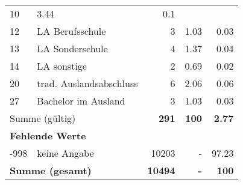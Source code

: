 \begin{longtable}{lXrrr}
       \num{10} &
       \num[round-mode=places,round-precision=2]{3,44} &
         \num[round-mode=places,round-precision=2]{0,1} \\

     12 &
     \multicolumn{1}{X}{ LA Berufsschule   } &


       \num{3} &
       \num[round-mode=places,round-precision=2]{1,03} &
         \num[round-mode=places,round-precision=2]{0,03} \\

     13 &
     \multicolumn{1}{X}{ LA Sonderschule   } &


       \num{4} &
       \num[round-mode=places,round-precision=2]{1,37} &
         \num[round-mode=places,round-precision=2]{0,04} \\

     14 &
     \multicolumn{1}{X}{ LA sonstige   } &


       \num{2} &
       \num[round-mode=places,round-precision=2]{0,69} &
         \num[round-mode=places,round-precision=2]{0,02} \\

     20 &
     \multicolumn{1}{X}{ trad. Auslandsabschluss   } &


       \num{6} &
       \num[round-mode=places,round-precision=2]{2,06} &
         \num[round-mode=places,round-precision=2]{0,06} \\

     27 &
     \multicolumn{1}{X}{ Bachelor im Ausland   } &


       \num{3} &
       \num[round-mode=places,round-precision=2]{1,03} &
         \num[round-mode=places,round-precision=2]{0,03} \\
     \midrule
     \multicolumn{2}{l}{Summe (gültig)} &
       \textbf{\num{291}} &
     \textbf{100} &
       \textbf{\num[round-mode=places,round-precision=2]{2,77}} \\
     \multicolumn{5}{l}{\textbf{Fehlende Werte}}\\
       -998 &
       keine Angabe &
         \num{10203} &
        - &
         \num[round-mode=places,round-precision=2]{97,23} \\
     \midrule
     \multicolumn{2}{l}{\textbf{Summe (gesamt)}} &
          \textbf{\num{10494}} &
        \textbf{-} &
        \textbf{100} \\
     \bottomrule
     \end{longtable}
     
